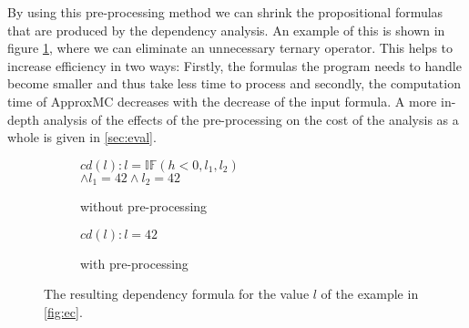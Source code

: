 By using this pre-processing method we can shrink the propositional formulas that are produced by the dependency analysis. An example of this is shown in figure \ref{fig:ppRes}, where we can eliminate an unnecessary ternary operator. This helps to increase efficiency in two ways: Firstly, the formulas the program needs to handle become smaller and thus take less time to process and secondly, the computation time of ApproxMC decreases with the decrease of the input formula. A more in-depth analysis of the effects of the pre-processing on the cost of the analysis as a whole is given in \ref{sec:eval}. 

\begin{figure}
    \begin{subfigure}[t]{.4\textwidth}
        \centering
        $cd(l) : l = \mathbb{IF}(h < 0, l_1, l_2)$ \\ $\land l_1 = 42 \land l_2 = 42$
        \caption{without pre-processing}
    \end{subfigure}
    \hfill
    \begin{subfigure}[t]{.4\textwidth}
        \centering
        $cd(l) : l = 42$
        \vspace{\baselineskip}
        \caption{with pre-processing}
    \end{subfigure}
    \caption{The resulting dependency formula for the value $l$ of the example in \ref{fig:ec}. }
    \label{fig:ppRes}
\end{figure}
